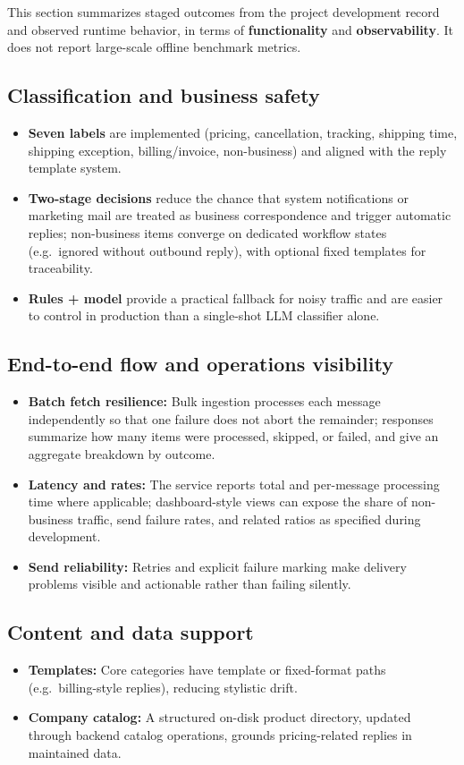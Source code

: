 \documentclass[12pt]{article}
\begin{document}
This section summarizes staged outcomes from the project development record and observed runtime behavior, in terms of \textbf{functionality} and \textbf{observability}. It does not report large-scale offline benchmark metrics.

\subsection{Classification and business safety}
\begin{itemize}
  \item \textbf{Seven labels} are implemented (pricing, cancellation, tracking, shipping time, shipping exception, billing/invoice, non-business) and aligned with the reply template system.
  \item \textbf{Two-stage decisions} reduce the chance that system notifications or marketing mail are treated as business correspondence and trigger automatic replies; non-business items converge on dedicated workflow states (e.g.\ ignored without outbound reply), with optional fixed templates for traceability.
  \item \textbf{Rules + model} provide a practical fallback for noisy traffic and are easier to control in production than a single-shot LLM classifier alone.
\end{itemize}

\subsection{End-to-end flow and operations visibility}
\begin{itemize}
  \item \textbf{Batch fetch resilience:} Bulk ingestion processes each message independently so that one failure does not abort the remainder; responses summarize how many items were processed, skipped, or failed, and give an aggregate breakdown by outcome.
  \item \textbf{Latency and rates:} The service reports total and per-message processing time where applicable; dashboard-style views can expose the share of non-business traffic, send failure rates, and related ratios as specified during development.
  \item \textbf{Send reliability:} Retries and explicit failure marking make delivery problems visible and actionable rather than failing silently.
\end{itemize}

\subsection{Content and data support}
\begin{itemize}
  \item \textbf{Templates:} Core categories have template or fixed-format paths (e.g.\ billing-style replies), reducing stylistic drift.
  \item \textbf{Company catalog:} A structured on-disk product directory, updated through backend catalog operations, grounds pricing-related replies in maintained data.
\end{itemize}
\end{document}
